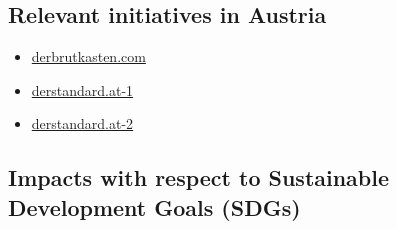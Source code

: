 \documentclass[
]{book}
\providecommand{\tightlist}{%
  \setlength{\itemsep}{0pt}\setlength{\parskip}{0pt}}
\begin{document}
\hypertarget{relevant-initiatives-in-austria-9}{%
\subsection*{Relevant initiatives in Austria}\label{relevant-initiatives-in-austria-9}}

\begin{itemize}
\tightlist
\item
  \href{https://www.derbrutkasten.com/autonome-lufttaxis-linz-ag-facc-ehang/}{derbrutkasten.com}
\item
  \href{https://www.derstandard.at/story/2000103120464/erste-teststrecke-fuer-e-lufttaxis-2020-in-linz}{derstandard.at-1}
\item
  \href{https://www.derstandard.at/story/2000122402408/flugtaxis-wann-kommt-der-tesla-der-luefte}{derstandard.at-2}
\end{itemize}

\hypertarget{impacts-with-respect-to-sustainable-development-goals-sdgs-9}{%
\subsection*{Impacts with respect to Sustainable Development Goals (SDGs)}\label{impacts-with-respect-to-sustainable-development-goals-sdgs-9}}
\end{document}
